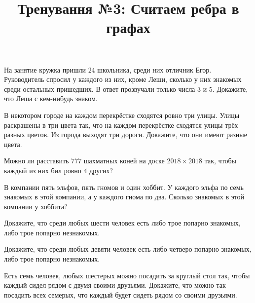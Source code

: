 


\title{Тренування №3: Считаем ребра в графах}
\maketitle
\begin{problem}
	На занятие кружка пришли $24$ школьника, среди них отличник Егор. Руководитель спросил у каждого из них, кроме Леши, сколько у них знакомых среди остальных пришедших. В ответ прозвучали только числа $3$ и $5$. Докажите, что Леша с кем-нибудь знаком.
\end{problem}

\begin{problem}
	В некотором городе на каждом перекрёстке сходятся ровно три улицы. Улицы раскрашены в три цвета так, что на каждом перекрёстке сходятся улицы трёх разных цветов. Из города выходят три дороги. Докажите, что они имеют разные цвета.
\end{problem}

\begin{problem}
	Можно ли расставить $777$ шахматных коней на доске $2018 \times 2018$ так, чтобы каждый из них бил ровно $4$ других?
\end{problem}

\begin{problem}
	В компании пять эльфов, пять гномов и один хоббит. У каждого эльфа по семь знакомых в этой компании, а у каждого гнома по два. Сколько знакомых в этой компании у хоббита?
\end{problem}

\begin{problem}
	Докажите, что среди любых шести человек есть либо трое попарно знакомых, либо трое попарно незнакомых.
\end{problem}

\begin{problem}
	Докажите, что среди любых девяти человек есть либо четверо попарно знакомых, либо трое попарно незнакомых.
\end{problem}

\begin{problem}
	Есть семь человек, любых шестерых можно посадить за круглый стол так, чтобы каждый сидел рядом с двумя своими друзьями. Докажите, что можно так посадить всех семерых, что каждый будет сидеть рядом со своими друзьями.
\end{problem}

